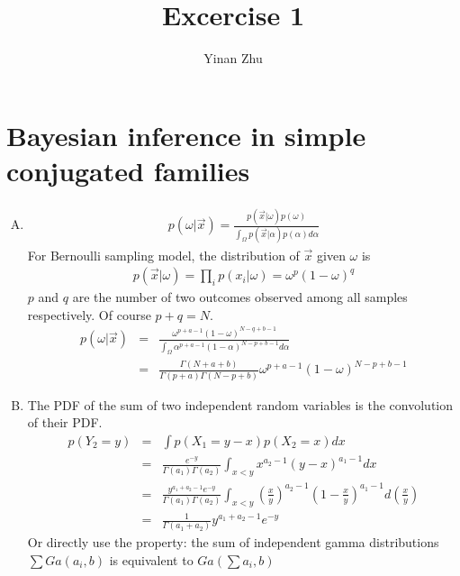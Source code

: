 \documentclass{article}
\title{Excercise 1}
\author{Yinan Zhu}
\date{}
\begin{document}
\maketitle
\section{Bayesian inference in simple conjugated families}
\begin{enumerate}[(A)]

\item

\begin{eqnarray}
p(\omega|\vec{x})=\frac{p(\vec{x}|\omega)p(\omega)}{\int_{\Omega}p(\vec{x}|\alpha)p(\alpha)d\alpha}
\end{eqnarray}
For Bernoulli sampling model, the distribution of $\vec{x}$ given $\omega$ is
\begin{eqnarray}
p(\vec{x}|\omega)=\prod_ip(x_i|\omega)=\omega^p(1-\omega)^q
\end{eqnarray}
$p$ and $q$ are the number of two outcomes observed among all samples respectively. Of course $p+q=N$.
\begin{eqnarray}
p(\omega|\vec{x})&=&\frac{\omega^{p+a-1}(1-\omega)^{N-q+b-1}}{\int_{\Omega}\alpha^{p+a-1}(1-\alpha)^{N-p+b-1}d\alpha}\nonumber\\
&=&\frac{\Gamma(N+a+b)}{\Gamma(p+a)\Gamma(N-p+b)}\omega^{p+a-1}(1-\omega)^{N-p+b-1}
\end{eqnarray}

\item

The PDF of the sum of two independent random variables is the convolution of their PDF.
\begin{eqnarray}
p(Y_2=y)&=&\int p(X_1=y-x)p(X_2=x)dx\nonumber\\
&=&\frac{e^{-y}}{\Gamma(a_1)\Gamma(a_2)}\int_{x<y} x^{a_2-1}(y-x)^{a_1-1}dx\nonumber\\
&=&\frac{y^{a_1+a_2-1}e^{-y}}{\Gamma(a_1)\Gamma(a_2)}\int_{x<y}  (\frac{x}{y})^{a_2-1}(1-\frac{x}{y})^{a_1-1}d(\frac{x}{y})\nonumber\\
&=&\frac{1}{\Gamma(a_1+a_2)}y^{a_1+a_2-1}e^{-y}
\end{eqnarray}
Or directly use the property: the sum of independent gamma distributions $\sum Ga(a_i,b)$ is equivalent to $Ga(\sum a_i,b)$


\end{enumerate}
\end{document}
